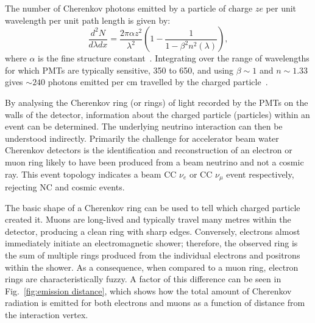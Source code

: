 The number of Cherenkov photons emitted by a particle of charge $ze$ per unit wavelength per unit
path length is given by:
\begin{equation}
    \frac{d^{2}N}{d\lambda dx}=\frac{2\pi\alpha z^{2}}{\lambda^{2}}
    \left(1-\frac{1}{1-\beta^{2}n^{2}(\lambda)}\right),
    \label{eq:cherenkov_emission}
\end{equation}
where $\alpha$ is the fine structure constant~\cite{particle2020}. Integrating over the range of
wavelengths for which PMTs are typically sensitive, \unit{350}{} to
\unit{650}{}, and using $\beta\sim 1$ and $n\sim 1.33$ gives $\sim240$ photons emitted
per cm travelled by the charged particle~\cite{perch2017}.

By analysing the Cherenkov ring (or rings) of light recorded by the PMTs on the walls of the
detector, information about the charged particle (particles) within an event can be determined.
The underlying neutrino interaction can then be understood indirectly. Primarily the challenge for
accelerator beam water Cherenkov detectors is the identification and reconstruction of an electron
or muon ring likely to have been produced from a beam neutrino and not a cosmic ray. This event
topology indicates a beam CC $\nu_{e}$ or CC $\nu_{\mu}$ event respectively, rejecting NC and
cosmic events.

The basic shape of a Cherenkov ring can be used to tell which charged particle created it. Muons
are long-lived and typically travel many metres within the detector, producing a clean ring with
sharp edges. Conversely, electrons almost immediately initiate an electromagnetic shower;
therefore, the observed ring is the sum of multiple rings produced from the individual electrons
and positrons within the shower. As a consequence, when compared to a muon ring, electron rings
are characteristically fuzzy. A factor of this difference can be seen in Fig.~\ref{fig:emission
    distance}, which shows how the total amount of Cherenkov radiation is emitted for both electrons
and muons as a function of distance from the interaction vertex.


